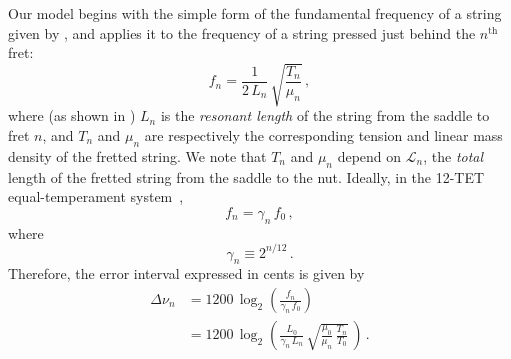 Our model begins with the simple form of the fundamental frequency of a string given by , and applies it to the frequency of a string pressed just behind the $n^\mathrm{th}$ fret:
 \begin{equation} \label{eqn:f_n_def}
f_n = \frac{1}{2\, L_n}\, \sqrt{\frac{T_n}{\mu_n}}\, ,
 \end{equation}
where (as shown in ) $L_n$ is the \emph{resonant length} of the string from the saddle to fret $n$, and $T_n$ and $\mu_n$ are respectively the corresponding tension and linear mass density of the fretted string. We note that $T_n$ and $\mu_n$ depend on $\mathcal{L}_n$, the \emph{total} length of the fretted string from the saddle to the nut. Ideally, in the 12-TET equal-temperament system~\cite{ref:durfee2015pms},
 \begin{equation} \label{eqn:f_n_tet}
f_n = \gamma_n\, f_0\, ,
 \end{equation}
where
 \begin{equation} \label{eqn:gamme_n_def}
\gamma_n \equiv 2^{n / 12}\, .
 \end{equation}
Therefore, the error interval expressed in cents is given by
 \begin{equation}\label{eqn:error_def}
 \begin{split}
\Delta \nu_n &= 1200\, \log_2\left( \frac{f_n}{\gamma_n\, f_0} \right) \\
&= 1200\, \log_2 \left( \frac{L_0}{\gamma_n\, L_n}\, \sqrt{\frac{\mu_0}{\mu_n}\, \frac{T_n}{T_0}}\, \right)\, .
 \end{split}
 \end{equation}